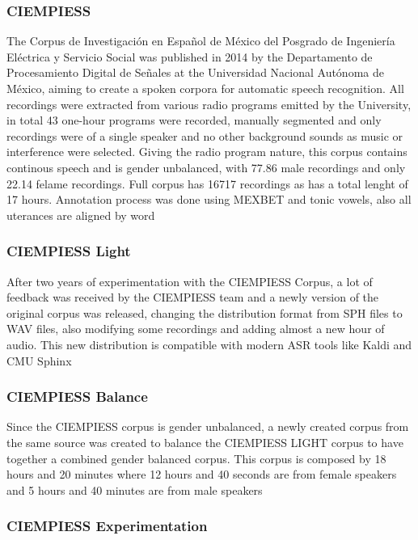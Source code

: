 \documentclass[10pt, a4paper]{article}
\begin{document}
\subsubsection{CIEMPIESS}

The Corpus de Investigación en Español de México del Posgrado de Ingeniería Eléctrica y Servicio Social was published in 2014 by the Departamento de Procesamiento Digital de Señales at the Universidad Nacional Autónoma de México, aiming to create a spoken corpora for automatic speech recognition. All recordings were extracted from various radio programs emitted by the University, in total 43 one-hour programs were recorded, manually segmented and only recordings were of a single speaker and no other background sounds as music or interference were selected. Giving the radio program nature, this corpus contains continous speech and is gender unbalanced, with 77.86 male recordings and only 22.14 felame recordings. Full corpus has 16717 recordings as has a total lenght of 17 hours. Annotation process was done using MEXBET and tonic vowels, also all uterances are aligned by word

\subsubsection{CIEMPIESS Light}

After two years of experimentation with the CIEMPIESS Corpus, a lot of feedback was received by the CIEMPIESS team and a newly version of the original corpus was released, changing the distribution format from SPH files to WAV files, also modifying some recordings and adding almost a new hour of audio. This new distribution is compatible with modern ASR tools like Kaldi and CMU Sphinx

\subsubsection{CIEMPIESS Balance}

Since the CIEMPIESS corpus is gender unbalanced, a newly created corpus from the same source was created to balance the CIEMPIESS LIGHT corpus to have together a combined gender balanced corpus. This corpus is composed by 18 hours and 20 minutes where 12 hours and 40 seconds are from female speakers and 5 hours and 40 minutes are from male speakers

\subsubsection{CIEMPIESS Experimentation}
\end{document}
